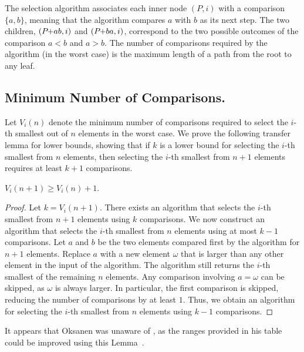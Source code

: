 \documentclass[a4paper,UKenglish,cleveref, autoref, thm-restate]{lipics-v2021}
\newcommand{\pchild}[3]{{#1}\kern-1pt{+}{#2}{#3}}
\begin{document}
The selection algorithm associates each inner node $(P, i)$ with a comparison $\{a, b\}$, meaning that the algorithm compares $a$ with $b$ as its next step.
The two children, $(\pchild{P}{a}{b}, i)$ and $(\pchild{P}{b}{a}, i)$, correspond to the two possible outcomes of the comparison $a < b$ and $a > b$.
The number of comparisons required by the algorithm (in the worst case) is the maximum length of a path from the root to any leaf.


\subsection{Minimum Number of Comparisons.}

Let $V_i(n)$ denote the minimum number of comparisons required to select the $i$-th smallest out of $n$ elements in the worst case.
We prove the following transfer lemma for lower bounds, showing that if $k$ is a lower bound for selecting the $i$-th smallest from $n$ elements, then selecting the $i$-th smallest from $n + 1$ elements requires at least $k + 1$ comparisons.

\begin{lemma} \label{lemma:previous_next_poset}
  $V_i(n + 1) \geq V_i(n) + 1$.
\end{lemma}

\begin{proof}
  Let $k = V_i(n + 1)$.
  There exists an algorithm that selects the $i$-th smallest from $n + 1$ elements using $k$ comparisons.
  We now construct an algorithm that selects the $i$-th smallest from $n$ elements using at most $k - 1$ comparisons.
  Let $a$ and $b$ be the two elements compared first by the algorithm for $n + 1$ elements.
  Replace $a$ with a new element $\omega$ that is larger than any other element in the input of the algorithm.
  The algorithm still returns the $i$-th smallest of the remaining $n$ elements.
  Any comparison involving $a = \omega$ can be skipped, as $\omega$ is always larger.
  In particular, the first comparison is skipped, reducing the number of comparisons by at least $1$.
  Thus, we obtain an algorithm for selecting the $i$-th smallest from $n$ elements using $k - 1$ comparisons.
\end{proof}

\begin{remark}
  It appears that Oksanen was unaware of , as the ranges provided in his table could be improved using this Lemma~\cite{Oksanen}.
\end{remark}
\end{document}
